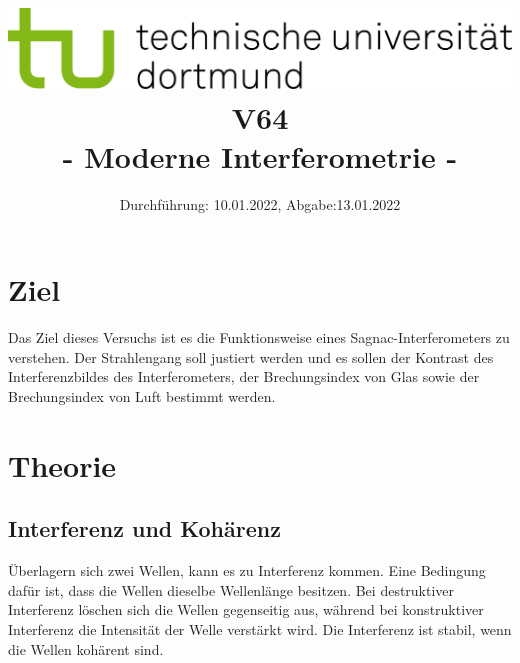 
\usepackage{romannum}
\usepackage{listings}
\lstset{numbers=left, numberstyle=\tiny, numbersep=5pt}
\lstset{language=Perl}

\title{\includegraphics[scale=0.8]{../logo.jpg} \\ \vspace*{1cm} V64 \\ - Moderne Interferometrie -}

\date{Durchführung: 10.01.2022, Abgabe:13.01.2022}



\maketitle

\tableofcontents
\newpage

\section{Ziel}
Das Ziel dieses Versuchs ist es die Funktionsweise eines Sagnac-Interferometers zu verstehen. Der Strahlengang soll justiert werden und es sollen der Kontrast des Interferenzbildes des Interferometers, der Brechungsindex von Glas sowie der Brechungsindex von Luft bestimmt werden.

\section{Theorie}

\subsection{Interferenz und Kohärenz}
Überlagern sich zwei Wellen, kann es zu Interferenz kommen. Eine Bedingung dafür ist, dass die Wellen dieselbe Wellenlänge besitzen.
Bei destruktiver Interferenz löschen sich die Wellen gegenseitig aus, während bei konstruktiver Interferenz die Intensität der Welle verstärkt wird.
Die Interferenz ist stabil, wenn die Wellen kohärent sind.

